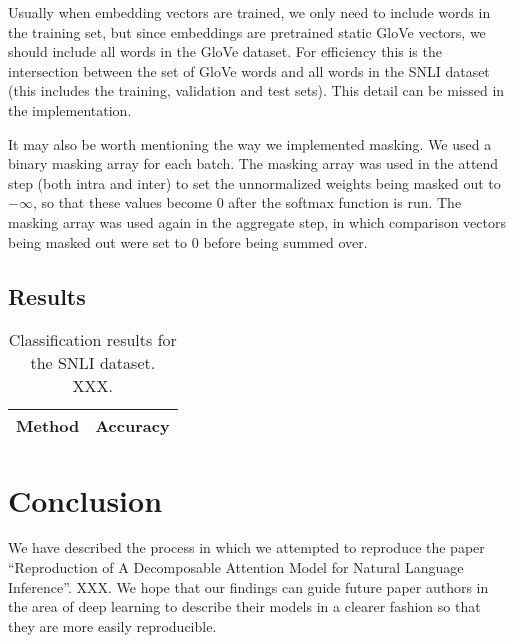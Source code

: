 \documentclass{article}
\begin{document}
Usually when embedding vectors are trained, we only need to include words in the training set, but since embeddings are pretrained static GloVe vectors, we should include all words in the GloVe dataset. For efficiency this is the intersection between the set of GloVe words and all words in the SNLI dataset (this includes the training, validation and test sets). This detail can be missed in the implementation.

It may also be worth mentioning the way we implemented masking. We used a binary masking array for each batch. The masking array was used in the attend step (both intra and inter) to set the unnormalized weights being masked out to $-\infty$, so that these values become $0$ after the softmax function is run. The masking array was used again in the aggregate step, in which comparison vectors being masked out were set to $0$ before being summed over.

\subsection{Results}

\begin{table}[htbp]\centering
\begin{tabular}{|l|r|}
    \hline
    Method     & Accuracy \\ \hline
    \hline
\end{tabular}
\caption{Classification results for the SNLI dataset. XXX.}
\label{table:results}
\end{table}

\section{Conclusion}
We have described the process in which we attempted to reproduce the paper ``Reproduction of A Decomposable Attention Model for Natural Language Inference''. XXX. We hope that our findings can guide future paper authors in the area of deep learning to describe their models in a clearer fashion so that they are more easily reproducible.

{}

\end{document}
